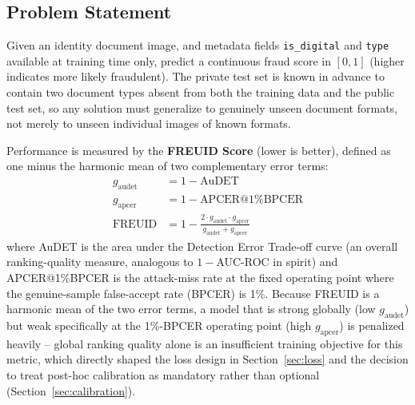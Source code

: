 \documentclass{article}
\begin{document}
\subsection{Problem Statement}

Given an identity document image, and metadata fields \texttt{is\_digital}
and \texttt{type} available at training time only, predict a continuous
fraud score in $[0,1]$ (higher indicates more likely fraudulent). The
private test set is known in advance to contain two document types absent
from both the training data and the public test set, so any solution must
generalize to genuinely unseen document formats, not merely to unseen
individual images of known formats.

Performance is measured by the \textbf{FREUID Score} (lower is better),
defined as one minus the harmonic mean of two complementary error terms:
\begin{align}
g_{\text{audet}} &= 1 - \text{AuDET} \\
g_{\text{apcer}} &= 1 - \text{APCER@1\%BPCER} \\
\text{FREUID} &= 1 - \frac{2 \cdot g_{\text{audet}} \cdot g_{\text{apcer}}}{g_{\text{audet}} + g_{\text{apcer}}}
\end{align}
where AuDET is the area under the Detection Error Trade-off curve (an
overall ranking-quality measure, analogous to $1{-}$AUC-ROC in spirit) and
APCER@1\%BPCER is the attack-miss rate at the fixed operating point where
the genuine-sample false-accept rate (BPCER) is 1\%. Because FREUID is a
harmonic mean of the two error terms, a model that is strong globally
(low $g_{\text{audet}}$) but weak specifically at the 1\%-BPCER operating
point (high $g_{\text{apcer}}$) is penalized heavily -- global ranking
quality alone is an insufficient training objective for this metric, which
directly shaped the loss design in Section~\ref{sec:loss} and the decision
to treat post-hoc calibration as mandatory rather than optional
(Section~\ref{sec:calibration}).
\end{document}
